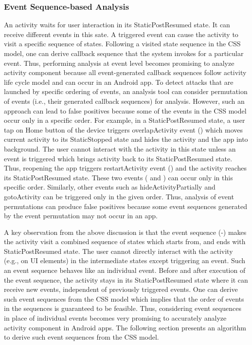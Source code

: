 \documentclass[10pt]{elsarticle}
\begin{document}
\subsubsection {Event Sequence-based Analysis} An activity waits for user interaction in its StaticPostResumed state. It can receive different events in this sate. A triggered event can cause the activity to visit a specific sequence of states. Following a visited state sequence in the CSS model, one can derive callback sequence that the system invokes for a particular event. Thus, performing analysis at event level becomes promising to analyze activity component because all event-generated callback sequences follow activity life cycle model and can occur in an Android app. To detect attacks that are launched by specific ordering of events, an analysis tool can consider permutation of events (i.e., their generated callback sequences) for analysis. However, such an approach can lead to false positives because some of the events in the CSS model occur only in a specific order. For example, in a StaticPostResumed state, a user tap on Home button of the device triggers overlapActivity event () which moves current activity to its StaticStopped state and hides the activity and the app into background. The user cannot interact with the activity in this state unless an event is triggered which brings activity back to its StaticPostResumed state. Thus, reopening the app triggers restartActivity event () and the activity reaches its StaticPostResumed state. These two events ( and ) can occur only in this specific order. Similarly, other events such as hideActivityPartially and gotoActivity can be triggered only in the given order. Thus, analysis of event permutations can produce false positives because some event sequences generated by the event permutation may not occur in an app. 


A key observation from the above discussion is that the event sequence (-) makes the activity visit a combined sequence of states which starts from, and ends with StaticPostResumed state. The user cannot directly interact with the activity (e.g., on UI elements) in the intermediate states except triggering an  event. Such an event sequence behaves like an individual event. Before and after execution of the event sequence, the activity stays in its StaticPostResumed state where it can receive new events, independent of previously triggered events. One can derive such event sequences from the CSS model which implies that the order of events in the sequences is guaranteed to be feasible. Thus, considering event sequences in place of individual events becomes very promising to accurately analyze activity component in Android apps. The following section presents an algorithm to derive such event sequences from the CSS model.  
\end{document}
